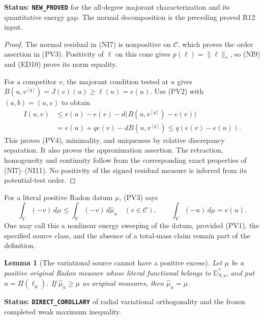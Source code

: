 \documentclass[11pt,a4paper]{article}
\numberwithin{equation}{section}
\newtheorem{lemma}[theorem]{Lemma}
\theoremstyle{definition}
\theoremstyle{remark}
\begin{document}
\noindent\textbf{Status: \texttt{NEW\_PROVED}} for the
all-degree majorant characterization and its quantitative
energy gap. The normal decomposition is the preceding
proved R12 input.

\begin{proof}
The normal residual in (NI7) is nonpositive on $\mathscr C$,
which proves the order assertion in (PV3). Positivity of
$\ell$ on this cone gives $p(\ell)=\|\ell\|_*$, so (NI9)
and (ED10) prove its norm equality.

For a competitor $v$, the majorant condition tested at $u$
gives $B(u,v^{[q]})=J(v)(u)\geq\ell(u)=e(u)$.
Use (PV2) with $(a,b)=(u,v)$ to obtain
\[
 \begin{split}
 I(u,v)&\leq e(u)-e(v)-d\bigl(B(u,v^{[q]})-e(v)\bigr)\\
       &=e(u)+q e(v)-d B(u,v^{[q]})
                         \leq q(e(v)-e(u)).
 \end{split}
\]
This proves (PV4), minimality, and uniqueness by relative
discrepancy separation. It also proves the approximation
assertion. The retraction, homogeneity and continuity follow
from the corresponding exact properties of (NI7)--(NI11).
No positivity of the signed residual measure is inferred
from its potential-test order.
\end{proof}

For a literal positive Radon datum $\mu$, (PV3) says
\[
      \int_V(-v)\,d\mu\leq\int_V(-v)\,d\widehat\mu_u
               \quad(v\in\mathscr C),\qquad
      \int_V(-u)\,d\mu=e(u).
 \tag{PV5}
\]
One may call this a nonlinear energy sweeping of the datum,
provided (PV1), the specified source class, and the absence
of a total-mass claim remain part of the definition.

\begin{lemma}[The variational source cannot have a positive excess]
\label{lem:r12-variational-positive-excess}
Let $\mu$ be a positive original Radon measure whose literal
functional belongs to $\mathbb D_{S,\mathrm s}^*$, and
put $u=\Pi(\ell_\mu)$. If $\widehat\mu_u\geq\mu$
as original measures, then $\widehat\mu_u=\mu$.
\end{lemma}

\noindent\textbf{Status: \texttt{DIRECT\_COROLLARY}} of
radial variational orthogonality and the frozen completed
weak maximum inequality.
\end{document}
